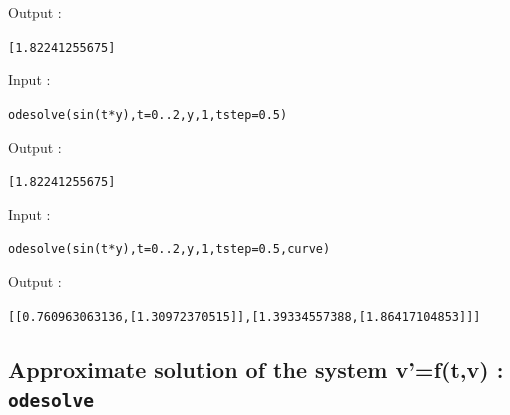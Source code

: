 \documentclass[a4paper,11pt]{book}
\begin{document}
Output :
\begin{center}{\tt [1.82241255675]}\end{center}
Input :
\begin{center}{\tt odesolve(sin(t*y),t=0..2,y,1,tstep=0.5)}\end{center}
Output :
\begin{center}{\tt [1.82241255675]}\end{center}
Input :
\begin{center}{\tt odesolve(sin(t*y),t=0..2,y,1,tstep=0.5,curve)}\end{center}
Output :
\begin{center}{\tt [[0.760963063136,[1.30972370515]],[1.39334557388,[1.86417104853]]]}\end{center}


\subsection{Approximate solution of the system v'=f(t,v) : {\tt odesolve}}
\end{document}
